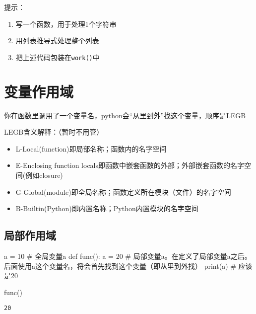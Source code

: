 \documentclass[
  letterpaper,
  DIV=11,
  numbers=noendperiod]{scrreprt}
\newenvironment{Shaded}{\begin{snugshade}}{\end{snugshade}}
\newcommand{\BuiltInTok}[1]{\textcolor[rgb]{0.00,0.23,0.31}{#1}}
\newcommand{\CommentTok}[1]{\textcolor[rgb]{0.37,0.37,0.37}{#1}}
\newcommand{\DecValTok}[1]{\textcolor[rgb]{0.68,0.00,0.00}{#1}}
\newcommand{\KeywordTok}[1]{\textcolor[rgb]{0.00,0.23,0.31}{#1}}
\newcommand{\NormalTok}[1]{\textcolor[rgb]{0.00,0.23,0.31}{#1}}
\newcommand{\OperatorTok}[1]{\textcolor[rgb]{0.37,0.37,0.37}{#1}}
\providecommand{\tightlist}{%
  \setlength{\itemsep}{0pt}\setlength{\parskip}{0pt}}\usepackage{longtable,booktabs,array}
\begin{document}
提示：

\begin{enumerate}
\def\labelenumi{\arabic{enumi}.}
\tightlist
\item
  写一个函数，用于处理1个字符串
\item
  用列表推导式处理整个列表
\item
  把上述代码包装在\texttt{work()}中
\end{enumerate}

\hypertarget{ux53d8ux91cfux4f5cux7528ux57df}{%
\section{变量作用域}\label{ux53d8ux91cfux4f5cux7528ux57df}}

你在函数里调用了一个变量名，python会``从里到外''找这个变量，顺序是LEGB

LEGB含义解释：（暂时不用管）

\begin{itemize}
\tightlist
\item
  L-Local(function)即局部名称；函数内的名字空间
\item
  E-Enclosing function
  locals即函数中嵌套函数的外部；外部嵌套函数的名字空间(例如closure)
\item
  G-Global(module)即全局名称；函数定义所在模块（文件）的名字空间
\item
  B-Builtin(Python)即内置名称；Python内置模块的名字空间
\end{itemize}

\hypertarget{ux5c40ux90e8ux4f5cux7528ux57df}{%
\subsection{局部作用域}\label{ux5c40ux90e8ux4f5cux7528ux57df}}

\begin{Shaded}
\begin{Highlighting}[]
\NormalTok{a }\OperatorTok{=} \DecValTok{10}      \CommentTok{\# 全局变量a}
\KeywordTok{def}\NormalTok{ func():}
\NormalTok{    a }\OperatorTok{=} \DecValTok{20}    \CommentTok{\# 局部变量a。在定义了局部变量a之后。后面使用a这个变量名，将会首先找到这个变量（即从里到外找）}
    \BuiltInTok{print}\NormalTok{(a)  }\CommentTok{\# 应该是20}
    
\NormalTok{func()}
\end{Highlighting}
\end{Shaded}

\begin{verbatim}
20
\end{verbatim}
\end{document}
